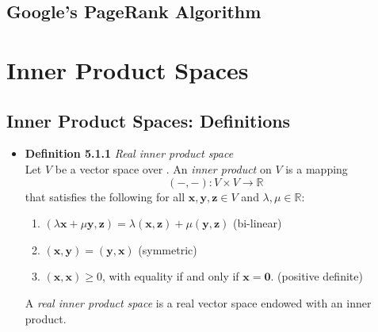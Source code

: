 \documentclass[11pt,a4paper]{article}
\begin{document}
\subsection{Google's PageRank Algorithm}

\section{Inner Product Spaces}

\subsection{Inner Product Spaces: Definitions}

\begin{itemize}

    \item \textbf{Definition 5.1.1} \emph{Real inner product space} \\
        Let $V$ be a vector space over .
        An \emph{inner product} on $V$ is a mapping
        \[
            (-, -) : V \times V \to \mathbb{R}
        \]
        that satisfies the following for all $\mathbf{x}, \mathbf{y}, \mathbf{z} \in V$
        and $\lambda, \mu \in \mathbb{R}$:
        \begin{enumerate}
            \item $(\lambda \mathbf{x} + \mu \mathbf{y}, \mathbf{z}) =
                \lambda(\mathbf{x}, \mathbf{z}) + \mu(\mathbf{y}, \mathbf{z})$
                \quad (bi-linear)
            \item $(\mathbf{x}, \mathbf{y}) = (\mathbf{y}, \mathbf{x})$
                \quad (symmetric)
            \item $(\mathbf{x}, \mathbf{x}) \geq 0$,
                with equality if and only if $\mathbf{x} = \mathbf{0}$.
                \quad (positive definite)
        \end{enumerate}
        A \emph{real inner product space} is a real vector space endowed with an inner product.


\end{itemize}
\end{document}

